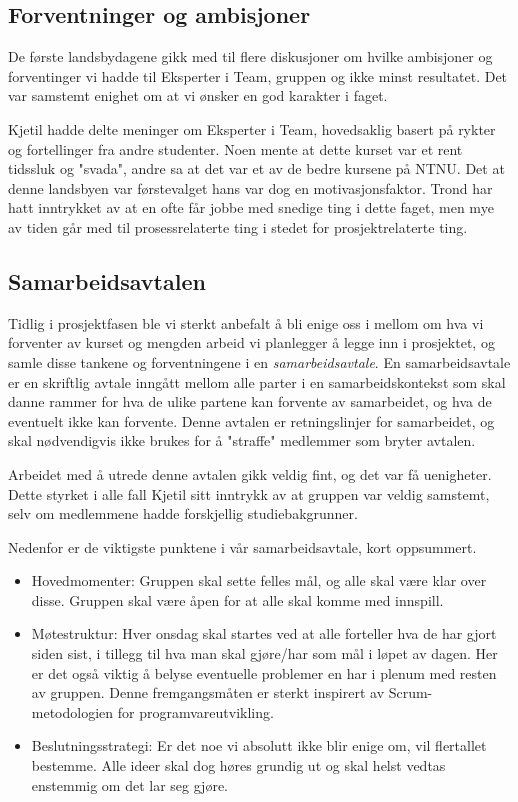 \subsection{Forventninger og ambisjoner}
De første landsbydagene gikk med til flere diskusjoner om hvilke ambisjoner og forventinger vi hadde til Eksperter i Team, gruppen og ikke minst resultatet. Det var samstemt enighet om at vi ønsker en god karakter i faget.

Kjetil hadde delte meninger om Eksperter i Team, hovedsaklig basert på rykter og fortellinger fra andre studenter. Noen mente at dette kurset var et rent tidssluk og "svada", andre sa at det var et av de bedre kursene på NTNU. Det at denne landsbyen var førstevalget hans var dog en motivasjonsfaktor. Trond har hatt inntrykket av at en ofte får jobbe med snedige ting i dette faget, men mye av tiden går med til prosessrelaterte ting i stedet for prosjektrelaterte ting.

\subsection{Samarbeidsavtalen}
Tidlig i prosjektfasen ble vi sterkt anbefalt å bli enige oss i mellom om hva vi forventer av kurset og mengden arbeid vi planlegger å legge inn i prosjektet, og samle disse tankene og forventningene i en \emph{samarbeidsavtale}. En samarbeidsavtale er en skriftlig avtale inngått mellom alle parter i en samarbeidskontekst som skal danne rammer for hva de ulike partene kan forvente av samarbeidet, og hva de eventuelt ikke kan forvente. Denne avtalen er retningslinjer for samarbeidet, og skal nødvendigvis ikke brukes for å "straffe" medlemmer som bryter avtalen\cite{samarbeidsavtale}.

Arbeidet med å utrede denne avtalen gikk veldig fint, og det var få uenigheter. Dette styrket i alle fall Kjetil sitt inntrykk av at gruppen var veldig samstemt, selv om medlemmene hadde forskjellig studiebakgrunner.

Nedenfor er de viktigste punktene i vår samarbeidsavtale, kort oppsummert.

\begin{itemize}
	\item Hovedmomenter: Gruppen skal sette felles mål, og alle skal være klar over disse. Gruppen skal være åpen for at alle skal komme med innspill.
	\item Møtestruktur: Hver onsdag skal startes ved at alle forteller hva de har gjort siden sist, i tillegg til hva man skal gjøre/har som mål i løpet av dagen. Her er det også viktig å belyse eventuelle problemer en har i plenum med resten av gruppen. Denne fremgangsmåten er sterkt inspirert av Scrum-metodologien\cite{Scrum} for programvareutvikling.
	\item Beslutningsstrategi: Er det noe vi absolutt ikke blir enige om, vil flertallet bestemme. Alle ideer skal dog høres grundig ut og skal helst vedtas enstemmig om det lar seg gjøre.
\end{itemize}

